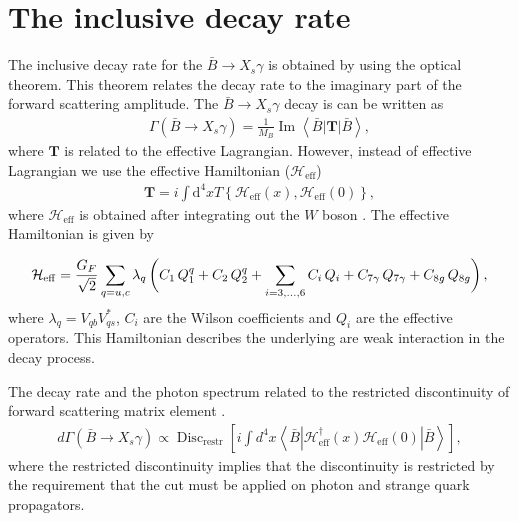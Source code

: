 \section{The inclusive decay rate}
The inclusive decay rate for the $\bar{B}\rightarrow X_s\gamma$ is obtained by using the optical theorem. This theorem relates the decay rate to the imaginary part of the forward scattering amplitude. The $\bar{B}\rightarrow X_s \gamma$ decay is can be written as
\begin{eqnarray}\label{eqn:Inclsv_dacay_rate_btoxgamm}
\Gamma\left(\bar{B} \rightarrow X_s\gamma\right)=\frac{1}{M_{B}} \operatorname{Im}\left\langle \bar{B}|\mathbf{T}| \bar{B}\right\rangle,
\end{eqnarray} 
where $\mathbf{T}$ is related to the effective Lagrangian. However, instead of effective Lagrangian we use the effective Hamiltonian ($\mathcal{H}_{\mathrm{eff}}$)
\begin{eqnarray}\label{eqn:Trans_matrix_btoxgam}
\mathbf{T}=i \int \mathrm{d}^{4} x T\left\{\mathcal{H}_{\mathrm{eff}}(x), \mathcal{H}_{\mathrm{eff}}(0)\right\}, 
\end{eqnarray}
where $\mathcal{H}_{\mathrm{eff}}$ is obtained after integrating out the $W$ boson \cite{Benzke:2010js}. The effective Hamiltonian is given by

\begin{equation}\label{eq:Weak Hamiltonian}
   {\cal H}_{\rm eff} = \frac{G_F}{\sqrt{2}} \sum_{q=u,c} \lambda_q\,
   \bigg( C_1\,Q_1^q + C_2\,Q_2^q + \sum_{i=3,...,6} C_i\,Q_i 
   + C_{7\gamma}\,Q_{7\gamma} + C_{8g}\,Q_{8g} \bigg) \,,
\end{equation}
where $\lambda_q=V_{qb} V_{qs}^*$, $C_{i}$ are the Wilson coefficients and $Q_i$ are the effective operators.
This Hamiltonian describes the underlying are weak interaction in the decay process.\par
The decay rate and the photon spectrum related to the restricted discontinuity of forward scattering matrix element \cite{Benzke:2010js}.
\begin{eqnarray}\label{eqn:discont_eval}
d \Gamma\left(\bar{B} \rightarrow X_{s} \gamma\right) \propto \operatorname{Disc}_{\mathrm{restr}}\left[i \int d^{4} x\left\langle\bar{B}\left|\mathcal{H}_{\mathrm{eff}}^{\dagger}(x) \mathcal{H}_{\mathrm{eff}}(0)\right| \bar{B}\right\rangle\right],
\end{eqnarray}
where the restricted discontinuity implies that the discontinuity is restricted by the requirement that the cut must be applied on photon and strange quark propagators. 

